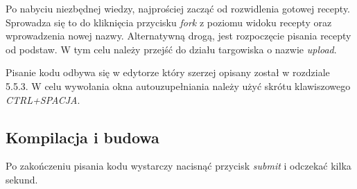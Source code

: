 \documentclass[11pt,a4paper,polish,thesis]{dcsbook}
\begin{document}
Po nabyciu niezbędnej wiedzy, najprościej zacząć od rozwidlenia gotowej recepty. Sprowadza się to do kliknięcia przycisku \emph{fork} z poziomu widoku recepty oraz
wprowadzenia nowej nazwy. Alternatywną drogą, jest rozpoczęcie pisania recepty od podstaw. W tym celu należy przejść do działu targowiska o nazwie \emph{upload}.

Pisanie kodu odbywa się w edytorze który szerzej opisany został w rozdziale 5.5.3. W celu wywołania okna autouzupełniania należy użyć skrótu klawiszowego
\emph{CTRL+SPACJA}.
\subsection{Kompilacja i budowa}
Po zakończeniu pisania kodu wystarczy nacisnąć przycisk \emph{submit} i odczekać kilka sekund.
\end{document}

